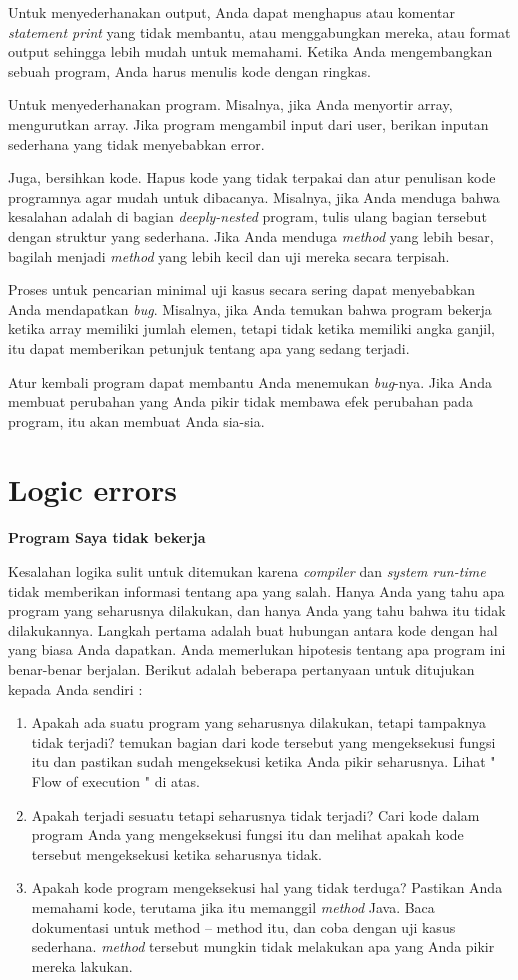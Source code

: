 Untuk menyederhanakan output, Anda dapat menghapus atau komentar \textit{statement print} yang tidak membantu, atau menggabungkan mereka, atau format output sehingga lebih mudah untuk memahami. Ketika Anda mengembangkan sebuah program, Anda harus menulis kode dengan ringkas.

Untuk menyederhanakan program. Misalnya, jika Anda menyortir array, mengurutkan array. Jika program mengambil input dari user, berikan inputan sederhana yang tidak menyebabkan error.

Juga, bersihkan kode. Hapus kode yang tidak terpakai dan atur penulisan kode programnya agar mudah untuk dibacanya. Misalnya, jika Anda menduga bahwa kesalahan adalah di bagian \textit{deeply-nested} program, tulis ulang bagian tersebut dengan struktur yang sederhana. Jika Anda menduga \textit{method} yang lebih besar, bagilah menjadi \textit{method} yang lebih kecil dan uji mereka secara terpisah.

Proses untuk pencarian minimal uji kasus secara sering dapat menyebabkan Anda mendapatkan \textit{bug}. Misalnya, jika Anda temukan bahwa program bekerja ketika array memiliki jumlah elemen, tetapi tidak ketika memiliki angka ganjil, itu dapat memberikan petunjuk tentang apa yang sedang terjadi.

Atur kembali program dapat membantu Anda menemukan \textit{bug}-nya. Jika Anda membuat perubahan yang Anda pikir tidak membawa efek perubahan pada program, itu akan membuat Anda sia-sia.

\section{Logic errors}

\noindent \textbf{Program Saya tidak bekerja}

\noindent Kesalahan logika sulit untuk ditemukan karena \textit{compiler} dan \textit{system run-time} tidak memberikan informasi tentang apa yang salah. Hanya Anda yang tahu apa program yang seharusnya dilakukan, dan hanya Anda yang tahu bahwa itu tidak dilakukannya.
Langkah pertama adalah buat hubungan antara kode dengan hal yang biasa Anda dapatkan. Anda memerlukan hipotesis tentang apa program ini benar-benar berjalan. Berikut adalah beberapa pertanyaan untuk ditujukan kepada Anda sendiri :
\begin{enumerate}
    \item Apakah ada suatu program yang seharusnya dilakukan, tetapi tampaknya tidak terjadi? temukan bagian dari kode tersebut yang mengeksekusi fungsi itu dan pastikan sudah mengeksekusi ketika Anda pikir seharusnya. Lihat " Flow of execution " di atas.
    \item Apakah terjadi sesuatu tetapi seharusnya tidak terjadi? Cari kode dalam program Anda yang mengeksekusi fungsi itu dan melihat apakah kode tersebut mengeksekusi ketika seharusnya tidak.
    \item Apakah kode program mengeksekusi hal yang tidak terduga? Pastikan Anda memahami kode, terutama jika itu memanggil \textit{method} Java. Baca dokumentasi untuk method – method itu, dan coba dengan uji kasus sederhana. \textit{method} tersebut mungkin tidak melakukan apa yang Anda pikir mereka lakukan.
\end{enumerate}

